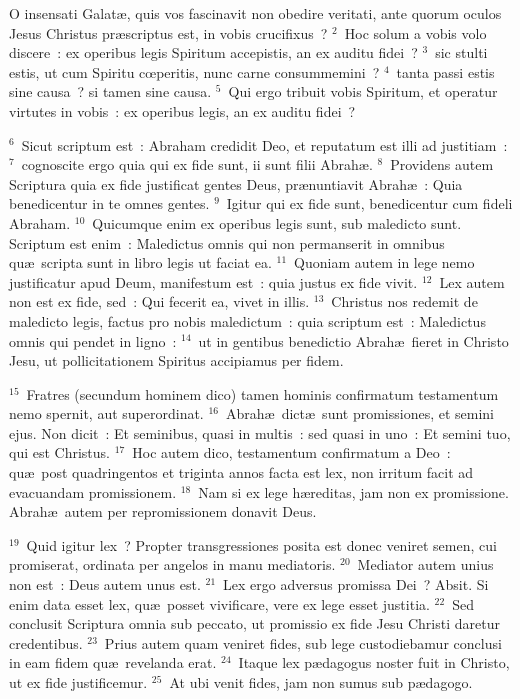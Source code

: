 \lettrine[lines=10,image=true,loversize=0.05,lraise=-0.03]{O}{} insensati Galat\ae , quis vos fascinavit non obedire veritati, ante quorum oculos Jesus Christus pr\ae scriptus est, in vobis crucifixus~?
${}^{2}$~Hoc solum a vobis volo discere~: ex operibus legis Spiritum accepistis, an ex auditu fidei~?
${}^{3}$~sic stulti estis, ut cum Spiritu cœperitis, nunc carne consummemini~?
${}^{4}$~tanta passi estis sine causa~? si tamen sine causa.
${}^{5}$~Qui ergo tribuit vobis Spiritum, et operatur virtutes in vobis~: ex operibus legis, an ex auditu fidei~?


${}^{6}$~Sicut scriptum est~: Abraham credidit Deo, et reputatum est illi ad justitiam~:
${}^{7}$~cognoscite ergo quia qui ex fide sunt, ii sunt filii Abrah\ae .
${}^{8}$~Providens autem Scriptura quia ex fide justificat gentes Deus, pr\ae nuntiavit Abrah\ae~: Quia benedicentur in te omnes gentes.
${}^{9}$~Igitur qui ex fide sunt, benedicentur cum fideli Abraham.
${}^{10}$~Quicumque enim ex operibus legis sunt, sub maledicto sunt. Scriptum est enim~: Maledictus omnis qui non permanserit in omnibus qu\ae\ scripta sunt in libro legis ut faciat ea.
${}^{11}$~Quoniam autem in lege nemo justificatur apud Deum, manifestum est~: quia justus ex fide vivit.
${}^{12}$~Lex autem non est ex fide, sed~: Qui fecerit ea, vivet in illis.
${}^{13}$~Christus nos redemit de maledicto legis, factus pro nobis maledictum~: quia scriptum est~: Maledictus omnis qui pendet in ligno~:
${}^{14}$~ut in gentibus benedictio Abrah\ae\ fieret in Christo Jesu, ut pollicitationem Spiritus accipiamus per fidem.


${}^{15}$~Fratres (secundum hominem dico) tamen hominis confirmatum testamentum nemo spernit, aut superordinat.
${}^{16}$~Abrah\ae\ dict\ae\ sunt promissiones, et semini ejus. Non dicit~: Et seminibus, quasi in multis~: sed quasi in uno~: Et semini tuo, qui est Christus.
${}^{17}$~Hoc autem dico, testamentum confirmatum a Deo~: qu\ae\ post quadringentos et triginta annos facta est lex, non irritum facit ad evacuandam promissionem.
${}^{18}$~Nam si ex lege h\ae reditas, jam non ex promissione. Abrah\ae\ autem per repromissionem donavit Deus.


${}^{19}$~Quid igitur lex~? Propter transgressiones posita est donec veniret semen, cui promiserat, ordinata per angelos in manu mediatoris.
${}^{20}$~Mediator autem unius non est~: Deus autem unus est.
${}^{21}$~Lex ergo adversus promissa Dei~? Absit. Si enim data esset lex, qu\ae\ posset vivificare, vere ex lege esset justitia.
${}^{22}$~Sed conclusit Scriptura omnia sub peccato, ut promissio ex fide Jesu Christi daretur credentibus.
${}^{23}$~Prius autem quam veniret fides, sub lege custodiebamur conclusi in eam fidem qu\ae\ revelanda erat.
${}^{24}$~Itaque lex p\ae dagogus noster fuit in Christo, ut ex fide justificemur.
${}^{25}$~At ubi venit fides, jam non sumus sub p\ae dagogo.


